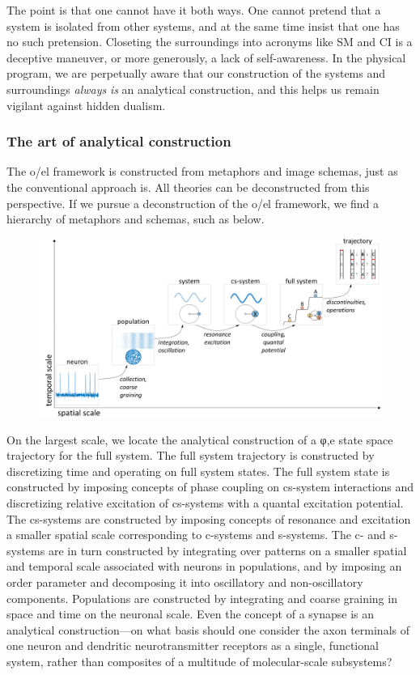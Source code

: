   The point is that one cannot have it both ways. One cannot pretend that a system is isolated from other systems, and at the same time insist that one has no such pretension. Closeting the surroundings into acronyms like SM and CI is a deceptive maneuver, or more generously, a lack of self-awareness. In the physical program, we are perpetually aware that our construction of the systems and surroundings \textit{always} \textit{is} an analytical construction, and this helps us remain vigilant against hidden dualism.

\subsubsection{The art of analytical construction}

The o/el framework is constructed from metaphors and image schemas, just as the conventional approach is. All theories can be deconstructed from this perspective. If we pursue a deconstruction of the o/el framework, we find a hierarchy of metaphors and schemas, such as below. 

  
\begin{figure}
\includegraphics[width=\textwidth]{figures/Tilsen-img169.png}
\caption{\missingcaption}
\label{fig:}
\end{figure}
 

  On the largest scale, we locate the analytical construction of a φ,e state space trajectory for the full system. The full system trajectory is constructed by discretizing time and operating on full system states. The full system state is constructed by imposing concepts of phase coupling on cs-system interactions and discretizing relative excitation of cs-systems with a quantal excitation potential. The cs-systems are constructed by imposing concepts of resonance and excitation a smaller spatial scale corresponding to c-systems and s-systems. The c- and s-systems are in turn constructed by integrating over patterns on a smaller spatial and temporal scale associated with neurons in populations, and by imposing an order parameter and decomposing it into oscillatory and non-oscillatory components. Populations are constructed by integrating and coarse graining in space and time on the neuronal scale. Even the concept of a synapse is an analytical construction—on what basis should one consider the axon terminals of one neuron and dendritic neurotransmitter receptors as a single, functional system, rather than composites of a multitude of molecular-scale subsystems? 

